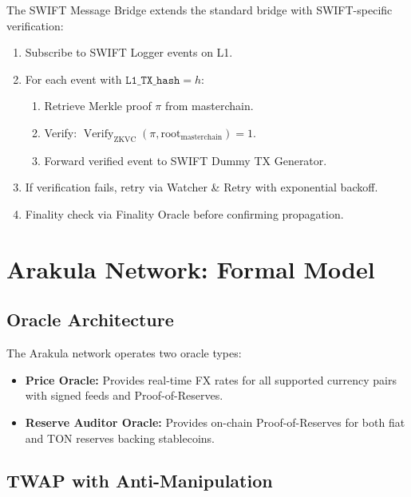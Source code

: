 \documentclass[12pt,a4paper]{article}
\theoremstyle{definition}
\theoremstyle{remark}
\DeclareMathOperator{\Verify}{Verify}
\begin{document}
The SWIFT Message Bridge extends the standard bridge with SWIFT-specific verification:

\begin{enumerate}[nosep]
    \item Subscribe to SWIFT Logger events on L1.
    \item For each event with $\texttt{L1\_TX\_hash} = h$:
    \begin{enumerate}[nosep]
        \item Retrieve Merkle proof $\pi$ from masterchain.
        \item Verify: $\Verify_{\text{ZKVC}}(\pi, \text{root}_{\text{masterchain}}) = 1$.
        \item Forward verified event to SWIFT Dummy TX Generator.
    \end{enumerate}
    \item If verification fails, retry via Watcher \& Retry with exponential backoff.
    \item Finality check via Finality Oracle before confirming propagation.
\end{enumerate}


\section{Arakula Network: Formal Model}
\label{sec:arakula-formal}

\subsection{Oracle Architecture}

The Arakula network operates two oracle types:

\begin{itemize}[nosep]
    \item \textbf{Price Oracle:} Provides real-time FX rates for all supported currency pairs with signed feeds and Proof-of-Reserves.
    \item \textbf{Reserve Auditor Oracle:} Provides on-chain Proof-of-Reserves for both fiat and TON reserves backing stablecoins.
\end{itemize}

\subsection{TWAP with Anti-Manipulation}
\label{sec:twap-formal}
\end{document}
